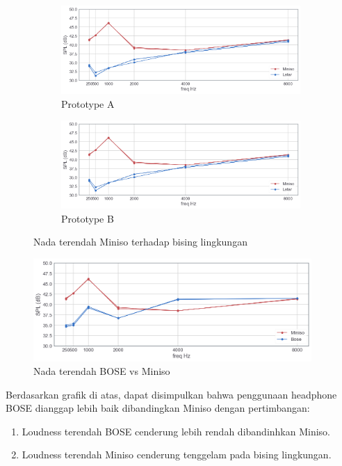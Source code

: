 \documentclass[12pt,]{article}
\begin{document}
\begin{itemize}
		\begin{figure}[!ht]
			\centering
			\begin{subfigure}[b]{0.5\textwidth}
				\includegraphics[width=\textwidth]{images/graph/minisolowest_unit1}
				\caption{Prototype A}
			\end{subfigure}
			\begin{subfigure}[b]{0.5\textwidth}
				\includegraphics[width=\textwidth]{images/graph/minisolowest_unit1}
				\caption{Prototype B}
			\end{subfigure}
			\caption{Nada terendah Miniso terhadap bising lingkungan}
		\end{figure}

		\begin{figure}[!ht]
			\centering
			\includegraphics[width=300pt]{images/graph/lowestbosevsminiso}
			\caption{Nada terendah BOSE vs Miniso}
		\end{figure}

		\newpage
		Berdasarkan grafik di atas, dapat disimpulkan bahwa penggunaan headphone BOSE dianggap lebih baik
		dibandingkan Miniso dengan pertimbangan:
		\begin{enumerate}
			\item Loudness terendah BOSE cenderung lebih rendah dibandinhkan Miniso.
			\item Loudness terendah Miniso cenderung tenggelam pada bising lingkungan.
		\end{enumerate}


\end{itemize}
\end{document}

